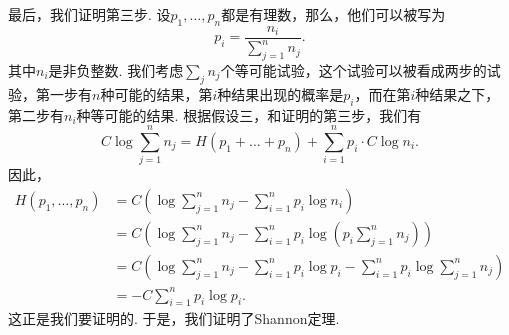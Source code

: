 \begin{appsec}
最后，我们证明第三步. 设$p_1,\dots,p_n$都是有理数，那么，他们可以被写为
\[
    p_i=\frac{n_i}{\sum_{j=1}^n n_j}.
\]
其中$n_i$是非负整数. 我们考虑$\sum_j n_j$个等可能试验，这个试验可以被看成两步的试验，第一步有$n$种可能的结果，第$i$种结果出现的概率是$p_i$，而在第$i$种结果之下，第二步有$n_i$种等可能的结果. 根据假设三，和证明的第三步，我们有
\[
   C\log\sum_{j=1}^nn_j=H(p_1+\dots+p_n)+\sum_{i=1}^n p_i\cdot C\log n_i.
\]
因此，
\begin{align*}
    H(p_1,\dots,p_n)&=C\left(\log\sum_{j=1}^nn_j-\sum_{i=1}^n p_i\log n_i\right)\\
    &=C\left(\log\sum_{j=1}^nn_j-\sum_{i=1}^n p_i\log\left(p_i\sum_{j=1}^n n_j\right)\right)\\
    &=C\left(\log\sum_{j=1}^nn_j-\sum_{i=1}^n p_i\log p_i-\sum_{i=1}^n p_i\log\sum_{j=1}^n n_j\right)\\
    &=-C\sum_{i=1}^n p_i\log p_i.
\end{align*}
这正是我们要证明的. 于是，我们证明了Shannon定理.
\end{appsec}

